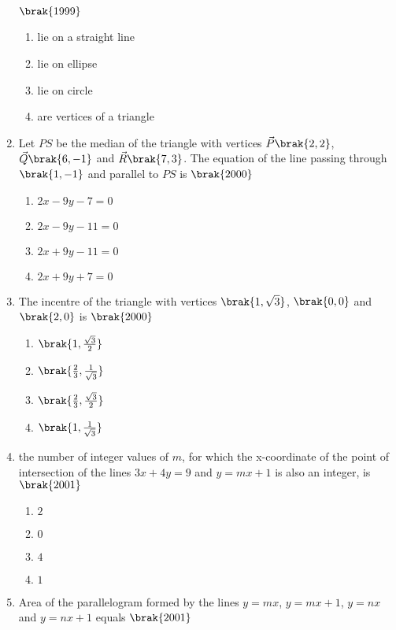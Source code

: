 \begin{enumerate}
\hfill{$\brak{1999}$}
\begin{multicols}{2}
\begin{enumerate}
        \item lie on a straight line
        \item lie on ellipse
        \item lie on circle
        \item are vertices of a triangle 
\end{enumerate}
\end{multicols}
\item Let $PS$ be the median of the triangle with vertices $\vec{P}\brak{2,2}$, $\vec{Q}\brak{6,-1}$ and $\vec{R}\brak{7,3}$. The equation of the line passing through $\brak{1,-1}$ and parallel to $PS$ is 
\hfill{$\brak{2000}$}
\begin{multicols}{2}
\begin{enumerate}
      \item $2x-9y-7=0$  
      \item $2x-9y-11=0$
      \item $2x+9y-11=0$
      \item $2x+9y+7=0$
\end{enumerate}
\end{multicols}
\item The incentre of the triangle with vertices $\brak{1,\sqrt{3}}$, $\brak{0,0}$ and $\brak{2,0}$ is 
\hfill{$\brak{2000}$}
\begin{multicols}{4}
\begin{enumerate}
     \item $\brak{1,\frac{\sqrt{3}}{2}}$
     \item $\brak{\frac{2}{3},\frac{1}{\sqrt{3}}}$
     \item $\brak{\frac{2}{3},\frac{\sqrt{3}}{2}}$
     \item $\brak{1,\frac{1}{\sqrt{3}}}$
\end{enumerate}
\end{multicols}
\item the number of integer values of $m$, for which the x-coordinate of the point of intersection of the lines $3x+4y=9$ and $y=mx+1$ is also an integer, is 
\hfill{$\brak{2001}$}
\begin{multicols}{4}
\begin{enumerate}
    \item $2$
    \item $0$
     \item $4$
     \item $1$
\end{enumerate}
\end{multicols}
\item Area of the parallelogram formed by the lines $y=mx$, $y=mx+1$, $y=nx$ and $y=nx+1$ equals
\hfill{$\brak{2001}$}
\begin{multicols}{4}
\begin{enumerate}
    

\end{enumerate}
\end{multicols}
\end{enumerate}
